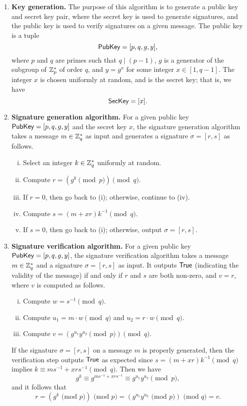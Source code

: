 \begin{enumerate}
    \item \textbf{Key generation.} The purpose of this algorithm is to generate a 
    public key and secret key pair, where the secret key is used to generate signatures, 
    and the public key is used to verify signatures on a given message. The 
    public key is a tuple 
    \[ {\sf PubKey} = [p, q, g, y], \] 
    where $p$ and $q$ are primes such that $q \mid (p-1)$, $g$ is a generator of the 
    subgroup of $\mathbb{Z}_p^*$ of order $q$, and $y = g^x$ for some integer $x \in [1, 
    q-1]$. The integer $x$ is chosen uniformly at random, and is the secret key; 
    that is, we have 
    \[ {\sf SecKey} = [x]. \] 

    \item \textbf{Signature generation algorithm.} For a given public key 
    ${\sf PubKey} = [p, q, g, y]$ and the secret key $x$, the signature generation 
    algorithm takes a message $m \in \mathbb{Z}_q^*$ as input and generates a signature 
    $\sigma = [r, s]$ as follows. 
    \begin{enumerate}[(i)]
        \item Select an integer $k \in \mathbb{Z}_q^*$ uniformly at random.
        \item Compute $r = (g^k \pmod p) \pmod q$. 
        \item If $r = 0$, then go back to (i); otherwise, continue to (iv). 
        \item Compute $s = (m + xr)k^{-1} \pmod q$. 
        \item If $s = 0$, then go back to (i); otherwise, output $\sigma = [r, s]$. 
    \end{enumerate}

    \item \textbf{Signature verification algorithm.} For a given public key 
    ${\sf PubKey} = [p, q, g, y]$, the signature verification algorithm takes a 
    message $m \in \mathbb{Z}_q^*$ and a signature $\sigma = [r, s]$ as input.
    It outputs ${\sf True}$ (indicating the validity of the message) if and only if 
    $r$ and $s$ are both non-zero, and $v = r$, where $v$ is computed as follows. 
    \begin{enumerate}[(i)]
        \item Compute $w = s^{-1} \pmod q$. 
        \item Compute $u_1 = m \cdot w \pmod q$ and $u_2 = r \cdot w \pmod q$. 
        \item Compute $v = (g^{u_1} y^{u_2} \pmod p) \pmod q$. 
    \end{enumerate}
    If the signature $\sigma = [r, s]$ on a message $m$ is properly generated, 
    then the verification step outputs ${\sf True}$ as expected since 
    $s = (m + xr)k^{-1} \pmod q$ implies $k \equiv ms^{-1} + xrs^{-1} \pmod q$. 
    Then we have 
    \[ g^k \equiv g^{ms^{-1} + xrs^{-1}} \equiv g^{u_1} y^{u_2} \pmod p, \] 
    and it follows that 
    \[ r = (g^k \text{ (mod $p$)}) \text{ (mod $p$)} = (g^{u_1} y^{u_2} 
    \text{ (mod $p$)}) \text{ (mod $q$)} = v. \]  
\end{enumerate}


